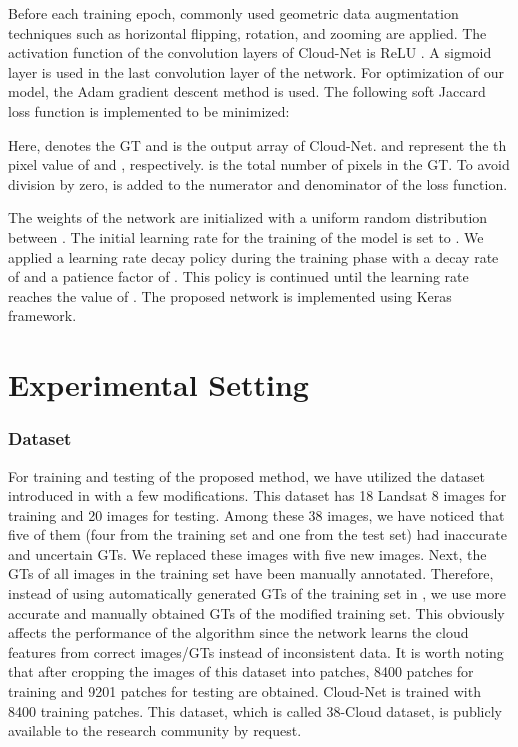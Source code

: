 \documentclass{article}
\begin{document}
Before each training epoch, commonly used geometric data augmentation techniques such as horizontal flipping, rotation, and zooming are applied. The activation function of the convolution layers of Cloud-Net is ReLU \cite{relu}. A sigmoid layer is used in the last convolution layer of the network. For optimization of our model, the Adam gradient descent method \cite{ADAM} is used. The following soft Jaccard loss function \cite{reza-unet,jacc1} is implemented to be minimized:

\vspace{-5mm}

Here,  denotes the GT and  is the output array of Cloud-Net.  and  represent the th pixel value of  and , respectively.  is the total number of pixels in the GT. To avoid division by zero,  is added to the numerator and denominator of the loss function.

The weights of the network are initialized with a uniform random distribution between . The initial learning rate for the training of the model is set to . We applied a learning rate decay policy during the training phase with a decay rate of  and a patience factor of . This policy is continued until the learning rate reaches the value of . The proposed network is implemented using Keras framework.

\section{Experimental Setting}
\label{sec:pagestyle}

\subsubsection{Dataset}
For training and testing of the proposed method, we have utilized the dataset introduced in \cite{mymmsp} with a few modifications. This dataset has 18 Landsat 8 images for training and 20 images for testing. Among these 38 images, we have noticed that five of them (four from the training set and one from the test set) had inaccurate and uncertain GTs. We replaced these images with five new images. Next, the GTs of all images in the training set have been manually annotated. Therefore, instead of using automatically generated GTs of the training set in \cite{mymmsp}, we use more accurate and manually obtained GTs of the modified training set. This obviously affects the performance of the algorithm since the network learns the cloud features from correct images/GTs instead of inconsistent data. It is worth noting that after cropping the images of this dataset into  patches, 8400 patches for training and 9201 patches for testing are obtained. Cloud-Net is trained with 8400 training patches. This dataset, which is called 38-Cloud dataset, is publicly available to the research community by request. 
\end{document}
